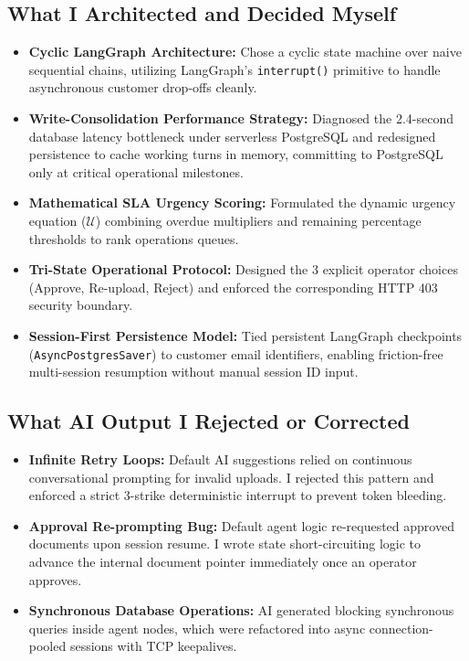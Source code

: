 \documentclass[12pt,a4paper]{article}
\begin{document}
\subsection{What I Architected and Decided Myself}
\begin{itemize}
    \item \textbf{Cyclic LangGraph Architecture:} Chose a cyclic state machine over naive sequential chains, utilizing LangGraph's \texttt{interrupt()} primitive to handle asynchronous customer drop-offs cleanly.
    \item \textbf{Write-Consolidation Performance Strategy:} Diagnosed the 2.4-second database latency bottleneck under serverless PostgreSQL and redesigned persistence to cache working turns in memory, committing to PostgreSQL only at critical operational milestones.
    \item \textbf{Mathematical SLA Urgency Scoring:} Formulated the dynamic urgency equation ($\mathcal{U}$) combining overdue multipliers and remaining percentage thresholds to rank operations queues.
    \item \textbf{Tri-State Operational Protocol:} Designed the 3 explicit operator choices (Approve, Re-upload, Reject) and enforced the corresponding HTTP 403 security boundary.
    \item \textbf{Session-First Persistence Model:} Tied persistent LangGraph checkpoints (\texttt{AsyncPostgresSaver}) to customer email identifiers, enabling friction-free multi-session resumption without manual session ID input.
\end{itemize}

\subsection{What AI Output I Rejected or Corrected}
\begin{itemize}
    \item \textbf{Infinite Retry Loops:} Default AI suggestions relied on continuous conversational prompting for invalid uploads. I rejected this pattern and enforced a strict 3-strike deterministic interrupt to prevent token bleeding.
    \item \textbf{Approval Re-prompting Bug:} Default agent logic re-requested approved documents upon session resume. I wrote state short-circuiting logic to advance the internal document pointer immediately once an operator approves.
    \item \textbf{Synchronous Database Operations:} AI generated blocking synchronous queries inside agent nodes, which were refactored into async connection-pooled sessions with TCP keepalives.
\end{itemize}
\end{document}
